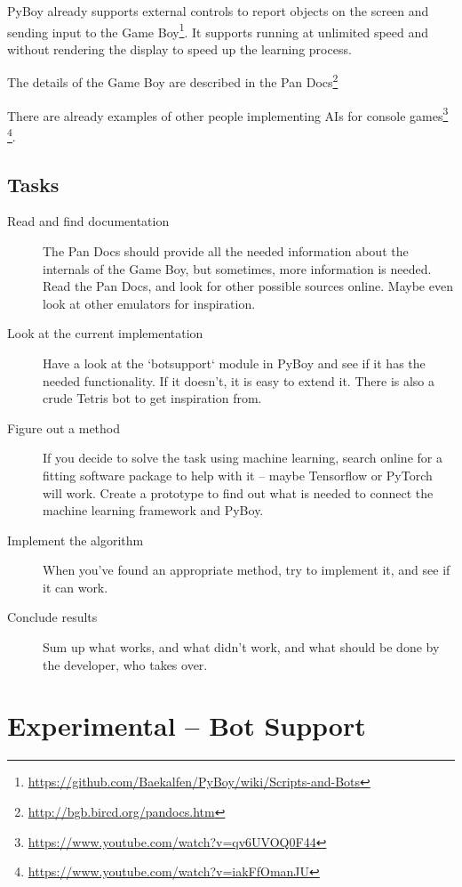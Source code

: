 \documentclass[11pt]{report} %
\begin{document}
PyBoy already supports external controls to report objects on the screen and sending input to the Game Boy\footnote{\url{https://github.com/Baekalfen/PyBoy/wiki/Scripts-and-Bots}}. It supports running at unlimited speed and without rendering the display to speed up the learning process.

The details of the Game Boy are described in the Pan Docs\footnote{\url{http://bgb.bircd.org/pandocs.htm}}

There are already examples of other people implementing AIs for console games\footnote{\url{https://www.youtube.com/watch?v=qv6UVOQ0F44}} \footnote{\url{https://www.youtube.com/watch?v=iakFfOmanJU}}.

\section*{Tasks}
\begin{description}
    \item [Read and find documentation]
        The Pan Docs should provide all the needed information about the internals of the Game Boy, but sometimes, more information is needed. Read the Pan Docs, and look for other possible sources online. Maybe even look at other emulators for inspiration.

    \item [Look at the current implementation]
        Have a look at the `botsupport` module in PyBoy and see if it has the needed functionality. If it doesn't, it is easy to extend it. There is also a crude Tetris bot to get inspiration from.

    \item [Figure out a method]
        If you decide to solve the task using machine learning, search online for a fitting software package to help with it -- maybe Tensorflow or PyTorch will work. Create a prototype to find out what is needed to connect the machine learning framework and PyBoy.

    \item [Implement the algorithm]
        When you've found an appropriate method, try to implement it, and see if it can work.


    \item [Conclude results]
        Sum up what works, and what didn't work, and what should be done by the developer, who takes over.

\end{description}

\chapter*{Experimental -- Bot Support}
\end{document}
